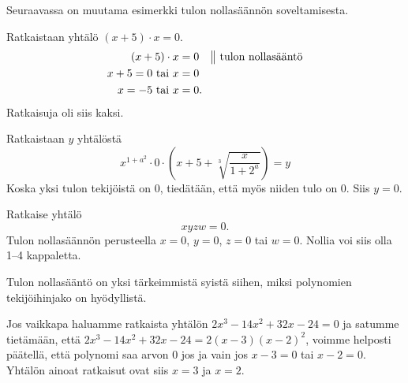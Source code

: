 
Seuraavassa on muutama esimerkki tulon nollasäännön soveltamisesta.

\begin{esimerkki} Ratkaistaan yhtälö $(x+5) \cdot x =0 $.
    \begin{align*}
        (x+5)\cdot x &=0 \quad \big\| \text{ tulon nollasääntö} \\
        x +5= 0 \text{ tai } x &=0 \\
        x= -5 \text{ tai } x &=0.
    \end{align*}
    Ratkaisuja oli siis kaksi.
\end{esimerkki}


\begin{esimerkki} Ratkaistaan $y$ yhtälöstä
    \[x^{1+a^2}\cdot 0\cdot\left(x+5+\sqrt[3]{\frac{x}{1+2^a}}\right)=y\]
    Koska yksi tulon tekijöistä on $0$, tiedätään, että myös niiden tulo on $0$.
    Siis $y=0$.
\end{esimerkki}

\begin{esimerkki} Ratkaise yhtälö
    \[xyzw=0.\]
Tulon nollasäännön perusteella $x=0$, $y=0$, $z=0$ tai $w=0$. Nollia voi siis
olla 1--4 kappaletta.
\end{esimerkki}

Tulon nollasääntö on yksi tärkeimmistä syistä siihen, miksi polynomien tekijöihinjako on hyödyllistä.

Jos vaikkapa haluamme ratkaista yhtälön $2x^3-14x^2+32x-24=0$ ja satumme tietämään, että $2x^3-14x^2+32x-24=2(x-3)(x-2)^2$,
voimme helposti päätellä, että polynomi saa arvon $0$ jos ja vain jos $x-3=0$ tai $x-2=0$. Yhtälön ainoat ratkaisut ovat siis $x=3$ ja $x=2$.

